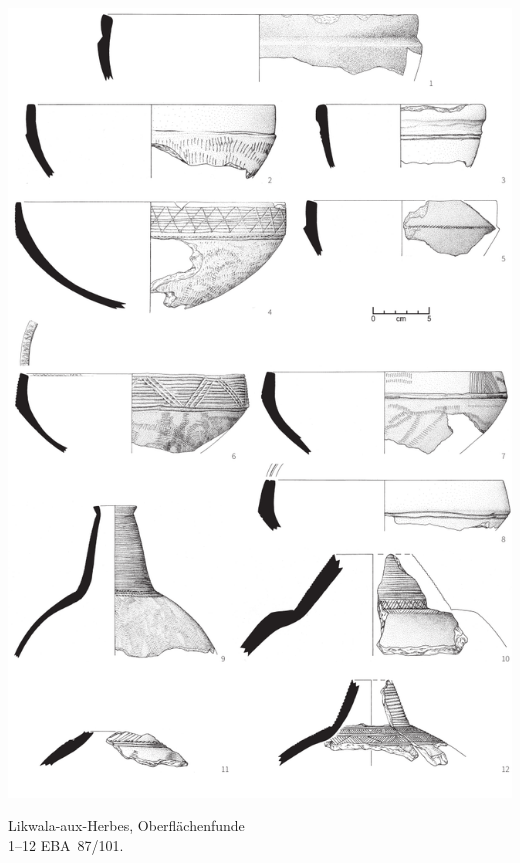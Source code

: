 \begin{pl}[H]
	\includegraphics{plt/Taf82.pdf}
	\vspace{.75em}\caption{Likwala-aux-Herbes, Oberflächenfunde \\ 1--12 EBA~87/101.}
	\label{pl:82}
\end{pl}

